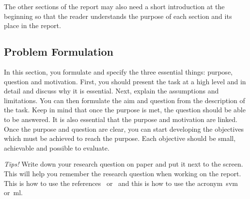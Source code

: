 The other sections of the report may also need a short introduction at the beginning so that the reader understands the purpose of each section and its place in the report.


\subsection{Problem Formulation} 

In this section, you formulate and specify the three essential things: purpose, question and motivation. First, you should present the task at a high level and in detail and discuss why it is essential. Next, explain the assumptions and limitations. You can then formulate the aim and question from the description of the task. Keep in mind that once the purpose is met, the question should be able to be answered. It is also essential that the purpose and motivation are linked. Once the purpose and question are clear, you can start developing the objectives which must be achieved to reach the purpose. Each objective should be small, achievable and possible to evaluate.  


\emph{Tips!} Write down your research question on paper and put it next to the screen. This will help you remember the research question when working on the report.
This is how to use the references~\cite{Berndtsson607210, Blomkvist2014} or~\citet{Turing1950} and this is how to use the acronym~\ac{svm} or~\ac{ml}.